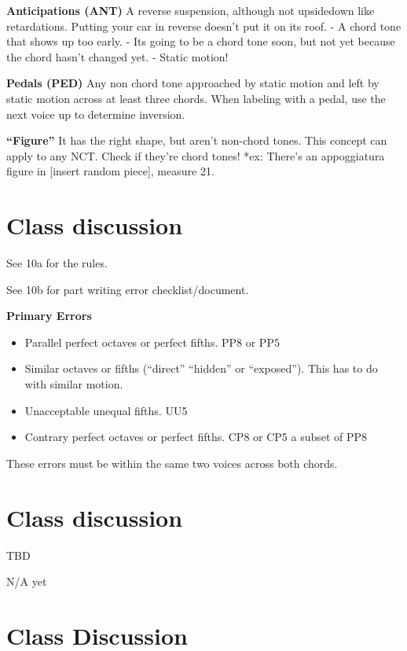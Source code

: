 \documentclass{book}
\providecommand{\tightlist}{%
  \setlength{\itemsep}{0pt}\setlength{\parskip}{0pt}}
\begin{document}
\textbf{Anticipations (ANT)} A reverse suspension, although not upsidedown
like retardations. Putting your car in reverse doesn't put it on its roof. - A
chord tone that shows up too early. - Its going to be a chord tone soon, but
not yet because the chord hasn't changed yet. - Static motion!

\textbf{Pedals (PED)} Any non chord tone approached by static motion and left
by static motion across at least three chords. When labeling with a pedal, use
the next voice up to determine inversion.

\textbf{``Figure''} It has the right shape, but aren't non-chord tones. This
concept can apply to any NCT. Check if they're chord tones! *ex: There's an
appoggiatura figure in {[}insert random piece{]}, measure 21.

\hypertarget{class-discussion-35}{%
\chapter{Class discussion}\label{class-discussion-35}}

See 10a for the rules.

See 10b for part writing error checklist/document.

\textbf{Primary Errors}

\begin{itemize}
\tightlist
\item
  Parallel perfect octaves or perfect fifths. PP8 or PP5
\item
  Similar octaves or fifths (``direct'' ``hidden'' or ``exposed''). This has
  to do with similar motion.
\item
  Unacceptable unequal fifths. UU5
\item
  Contrary perfect octaves or perfect fifths. CP8 or CP5 a subset of PP8
\end{itemize}

These errors must be within the same two voices across both chords.

\hypertarget{class-discussion-36}{%
\chapter{Class discussion}\label{class-discussion-36}}

TBD

N/A yet

\hypertarget{class-discussion-37}{%
\chapter{Class Discussion}\label{class-discussion-37}}
\end{document}
